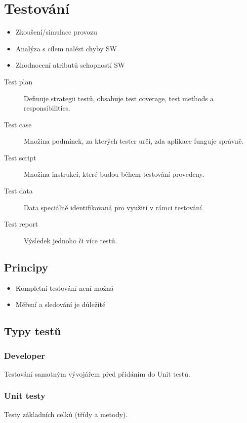 \section{Testování}
  \begin{itemize}
    \item Zkoušení/simulace provozu
    \item Analýza s cílem nalézt chyby SW
    \item Zhodnocení atributů schopností SW
  \end{itemize}

  \begin{description}
    \item[Test plan] Definuje strategii testů, obsahuje test coverage, test methods a responsibilities.
    \item[Test case] Množina podmínek, za kterých tester určí, zda aplikace funguje správně.
    \item[Test script] Množina instrukcí, které budou během testování provedeny.
    \item[Test data] Data speciálně identifikovaná pro využití v rámci testování.
    \item[Test report] Výsledek jednoho či více testů.
  \end{description}

  \subsection{Principy}
    \begin{itemize}
      \item Kompletní testování není možná
      \item Měření a sledování je důležité
    \end{itemize}

  \subsection{Typy testů}
    \subsubsection{Developer}
      Testování samotným vývojářem před přidáním do Unit testů.

    \subsubsection{Unit testy}
      Testy základních celků (třídy a metody).

